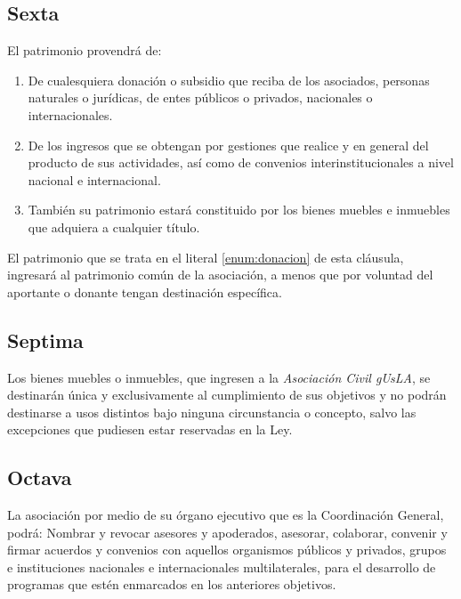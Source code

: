       \subsection{Sexta}
        El patrimonio provendr\'a de:
        
        \begin{enumerate}
          
          \item 
            \label{enum:donacion}De cualesquiera donaci\'on o subsidio que
            reciba de los asociados, personas naturales o jur\'i{}dicas, de
            entes p\'ublicos o privados, nacionales o internacionales.

          \item 
            De los ingresos que se obtengan por gestiones que realice y en
            general del producto de sus actividades, as\'i{} como de convenios
            interinstitucionales a nivel nacional e internacional.
          
          \item 
            Tambi\'en su patrimonio estar\'a constituido por los bienes muebles
            e inmuebles que adquiera a cualquier t\'i{}tulo. 

        \end{enumerate}

        El patrimonio que se trata en el literal \ref{enum:donacion} de esta
        cl\'ausula, ingresar\'a al patrimonio com\'un de la asociaci\'on, a
        menos que por voluntad del aportante o donante tengan destinaci\'on
        espec\'i{}fica.

      \subsection{Septima}
        Los bienes muebles o inmuebles, que ingresen a la \emph{Asociaci\'on
        Civil gUsLA}, se destinar\'an \'unica y exclusivamente al
        cumplimiento de sus objetivos y no podr\'an destinarse a usos distintos
        bajo ninguna circunstancia o concepto, salvo las excepciones que
        pudiesen estar reservadas en la Ley.

      \subsection{Octava}
        La asociaci\'on por medio de su \'organo ejecutivo que es la
        Coordinaci\'on General, podr\'a: Nombrar y revocar asesores y
        apoderados, asesorar, colaborar, convenir y firmar acuerdos y convenios
        con aquellos organismos p\'ublicos y privados, grupos e instituciones
        nacionales e internacionales multilaterales, para el desarrollo de
        programas que est\'en enmarcados en los anteriores objetivos.

